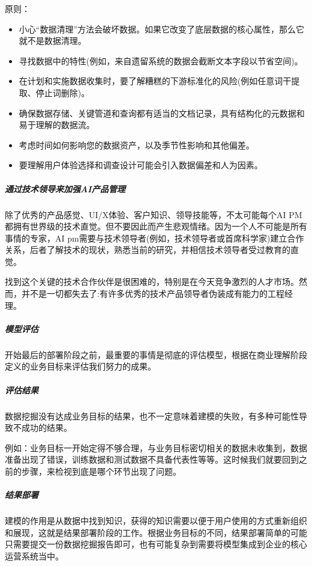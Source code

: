 \documentclass[letterpaper,11pt,english]{sphinxmanual}
\begin{document}
原则：
\begin{itemize}
\item {} 
小心“数据清理”方法会破坏数据。如果它改变了底层数据的核心属性，那么它就不是数据清理。

\item {} 
寻找数据中的特性(例如，来自遗留系统的数据会截断文本字段以节省空间)。

\item {} 
在计划和实施数据收集时，要了解糟糕的下游标准化的风险(例如任意词干提取、停止词删除)。

\item {} 
确保数据存储、关键管道和查询都有适当的文档记录，具有结构化的元数据和易于理解的数据流。

\item {} 
考虑时间如何影响您的数据资产，以及季节性影响和其他偏差。

\item {} 
要理解用户体验选择和调查设计可能会引入数据偏差和人为因素。

\end{itemize}


\subparagraph{通过技术领导来加强AI产品管理}
\label{\detokenize{chapter_project/process:id25}}
除了优秀的产品感觉、UI/X体验、客户知识、领导技能等，不太可能每个AI
PM都拥有世界级的技术直觉。但不要因此而产生悲观情绪。因为一个人不可能是所有事情的专家，AI
pm需要与技术领导者(例如，技术领导者或首席科学家)建立合作关系，后者了解技术的现状，熟悉当前的研究，并相信技术领导者受过教育的直觉。

找到这个关键的技术合作伙伴是很困难的，特别是在今天竞争激烈的人才市场。然而，并不是一切都失去了:有许多优秀的技术产品领导者伪装成有能力的工程经理。


\subparagraph{模型评估}
\label{\detokenize{chapter_project/process:id26}}
开始最后的部署阶段之前，最重要的事情是彻底的评估模型，根据在商业理解阶段定义的业务目标来评估我们努力的成果。


\subparagraph{评估结果}
\label{\detokenize{chapter_project/process:id27}}
数据挖掘没有达成业务目标的结果，也不一定意味着建模的失败，有多种可能性导致不成功的结果。

例如：业务目标一开始定得不够合理，与业务目标密切相关的数据未收集到，数据准备出现了错误，训练数据和测试数据不具备代表性等等。这时候我们就要回到之前的步骤，来检视到底是哪个环节出现了问题。


\subparagraph{结果部署}
\label{\detokenize{chapter_project/process:id28}}
建模的作用是从数据中找到知识，获得的知识需要以便于用户使用的方式重新组织和展现，这就是结果部署阶段的工作。根据业务目标的不同，结果部署简单的可能只需要提交一份数据挖掘报告即可，也有可能复杂到需要将模型集成到企业的核心运营系统当中。
\end{document}
